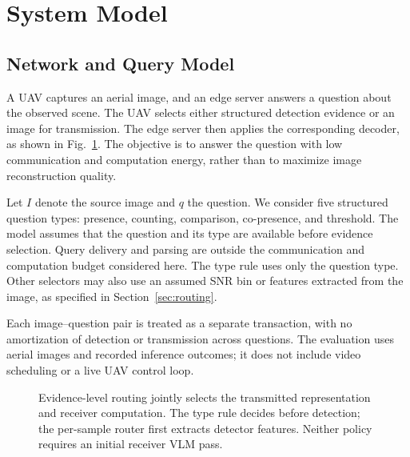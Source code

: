 \section{System Model}\label{sec:system}

\subsection{Network and Query Model}
A UAV captures an aerial image, and an edge server answers a question
about the observed scene. The UAV selects either structured detection
evidence or an image for transmission. The edge server then applies
the corresponding decoder, as shown in Fig.~\ref{fig:arch}. The
objective is to answer the question with low communication and
computation energy, rather than to maximize image reconstruction quality.

Let $I$ denote the source image and $q$ the question. We consider five
structured question types: presence, counting, comparison, co-presence,
and threshold. The model assumes that the question and its type are
available before evidence selection. Query delivery and parsing are
outside the communication and computation budget considered here.
The type rule uses only the question type. Other selectors may also
use an assumed SNR bin or features extracted from the image, as
specified in Section~\ref{sec:routing}.

Each image--question pair is treated as a separate transaction, with
no amortization of detection or transmission across questions. The
evaluation uses aerial images and recorded inference outcomes; it
does not include video scheduling or a live UAV control loop.

\begin{figure}[!t]\centering
{}
\caption{Evidence-level routing jointly selects the transmitted
representation and receiver computation. The type rule decides
before detection; the per-sample router first extracts detector
features. Neither policy requires an initial receiver VLM pass.}\label{fig:arch}
\end{figure}

